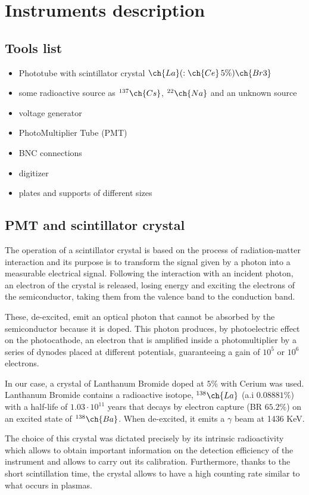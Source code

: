 \documentclass[a4paper,twoside,openany]{book}
\begin{document}
\setcounter{page}{1}
\chapter{Instruments description}
	\section {Tools list}
\begin{itemize}
\item Phototube with scintillator crystal $\ch{La}(:\ch{Ce}\,5\%)\ch{Br3}$
\item some radioactive source as $^{137}\ch{Cs}$, $^{22}\ch{Na}$ and an unknown source
\item voltage generator
\item PhotoMultiplier Tube (PMT)
\item BNC connections
\item digitizer
\item plates and supports of different sizes
\end{itemize}

	\section{PMT and scintillator crystal}
The operation of a scintillator crystal is based on the process of radiation-matter interaction and its purpose is to transform the signal given by a photon into a measurable electrical signal. Following the interaction with an incident photon, an electron of the crystal is released, losing energy and exciting the electrons of the semiconductor, taking them from the valence band to the conduction band. 

These, de-excited, emit an optical photon that cannot be absorbed by the semiconductor because it is doped. This photon produces, by photoelectric effect on the photocathode, an electron that is amplified inside a photomultiplier by a series of dynodes placed at different potentials, guaranteeing a gain of $10^{5}$ or $10^{6}$ electrons.

In our case, a crystal of Lanthanum Bromide doped at $5\%$ with Cerium was used. Lanthanum Bromide contains a radioactive isotope, $^{138}\ch{La}$ (a.i $0.08881\%$) with a half-life of $1.03  \cdot 10^{11}$ years that decays by electron capture (BR $65.2\%$) on an excited state of $^{138}\ch{Ba}$. When de-excited, it emits a $\gamma$ beam at 1436 KeV. 

The choice of this crystal was dictated precisely by its intrinsic radioactivity which allows to obtain important information on the detection efficiency of the instrument and allows to carry out its calibration. Furthermore, thanks to the short scintillation time, the crystal allows to have a high counting rate similar to what occurs in plasmas.
\end{document}
